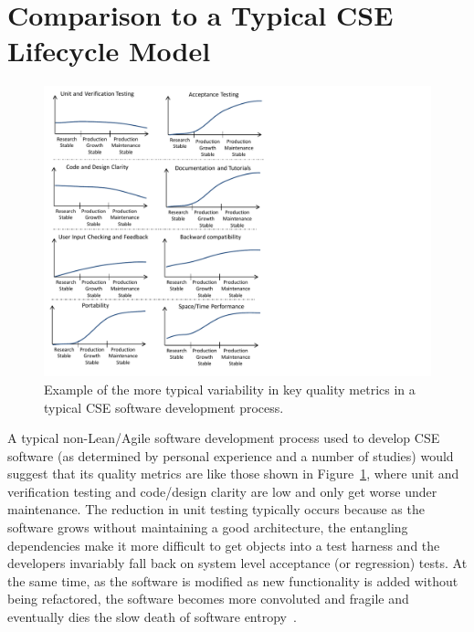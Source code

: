\documentclass[11pt]{SANDreport}
\begin{document}
%
\section{Comparison to a Typical CSE Lifecycle Model}
\label{sec:compare_with_typical_CSE_model}
%

\begin{figure}
\begin{center}
\includegraphics[trim = 0.1in 0.1in 4.0in 0.1in, scale=0.85]
{TypicalNonAgileSoftwarePhases}
{}\caption{Example of the more typical variability in key quality
metrics in a typical CSE software development process.}
\label{fig:TypicalNonAgileSoftwarePhases}
\end{center}
\end{figure}

A typical non-Lean/Agile software development process used to develop CSE software (as determined by personal experience and a number of studies) would suggest that its quality metrics are like those shown in Figure~\ref{fig:TypicalNonAgileSoftwarePhases}, where unit and verification testing and code/design clarity are low and only get worse under maintenance.  The reduction in unit testing typically occurs because as the software grows without maintaining a good architecture, the entangling dependencies make it more difficult to get objects into a test harness and the developers invariably fall back on system level acceptance (or regression) tests. At the same time, as the software is modified as new functionality is added without being refactored, the software becomes more convoluted and fragile and eventually dies the slow death of software entropy~\cite{MythicalManMonth95}.
\end{document}

